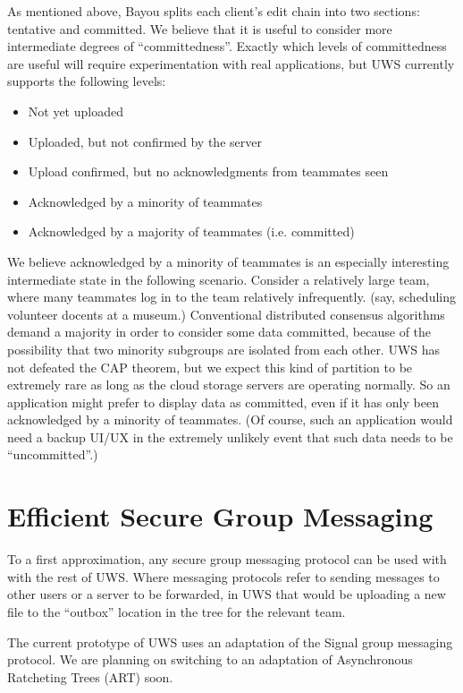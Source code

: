 \documentclass[runningheads]{llncs}
\begin{document}
As mentioned above, Bayou splits each client's edit chain into two sections: tentative and committed.
We believe that it is useful to consider more intermediate degrees of ``committedness''.
Exactly which levels of committedness are useful will require experimentation with real applications, but UWS currently supports the following levels:

\begin{itemize}
\item Not yet uploaded
\item Uploaded, but not confirmed by the server
\item Upload confirmed, but no acknowledgments from teammates seen
\item Acknowledged by a minority of teammates
\item Acknowledged by a majority of teammates (i.e. committed)
\end{itemize}

We believe acknowledged by a minority of teammates is an especially interesting intermediate state in the following scenario.
Consider a relatively large team, where many teammates log in to the team relatively infrequently.
(say, scheduling volunteer docents at a museum.)
Conventional distributed consensus algorithms demand a majority in order to consider some data committed, because of the possibility that two minority subgroups are isolated from each other.
UWS has not defeated the CAP theorem, but we expect this kind of partition to be extremely rare as long as the cloud storage servers are operating normally.
So an application might prefer to display data as committed, even if it has only been acknowledged by a minority of teammates.
(Of course, such an application would need a backup UI{\slash}UX in the extremely unlikely event that such data needs to be ``uncommitted''.)


\section{Efficient Secure Group Messaging}

To a first approximation, any secure group messaging protocol can be used with with the rest of UWS.
Where messaging protocols refer to sending messages to other users or a server to be forwarded, in UWS that would be uploading a new file to the ``outbox'' location in the tree for the relevant team.

The current prototype of UWS uses an adaptation of the Signal group messaging protocol.
We are planning on switching to an adaptation of Asynchronous Ratcheting Trees (ART)\cite{Cohn-Gordon2018} soon.
\end{document}
